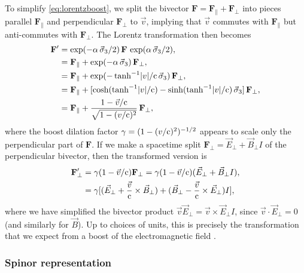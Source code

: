 \documentclass[1p,sort&compress]{elsarticle}
\numberwithin{equation}{section}
\newcommand{\rv}[1]{\vec{#1}}
\newcommand{\bv}[1]{\mathbf{#1}}
\newcommand{\cc}{{\rm c}}
\begin{document}
To simplify \eqref{eq:lorentzboost}, we split the bivector $\bv{F} = \bv{F}_\parallel + \bv{F}_\perp$ into pieces parallel $\bv{F}_\parallel$ and perpendicular $\bv{F}_\perp$ to $\rv{v}$, implying that $\rv{v}$ commutes with $\bv{F}_\parallel$ but anti-commutes with $\bv{F}_\perp$.  The Lorentz transformation then becomes
\begin{align}
  \bv{F}' &= \exp(-\alpha\, \rv{\sigma}_3/2)\,\bv{F}\,\exp(\alpha\,\rv{\sigma}_3/2), \\
  &= \bv{F}_\parallel + \exp(-\alpha\,\rv{\sigma}_3)\,\bv{F}_\perp, \nonumber \\
  &= \bv{F}_\parallel + \exp(-\tanh^{-1}\!|v|/\cc\,\rv{\sigma}_3)\, \bv{F}_\perp, \nonumber \\
  &= \bv{F}_\parallel + [\cosh(\tanh^{-1}\!|v|/\cc) - \sinh(\tanh^{-1}\!|v|/\cc)\,\rv{\sigma}_3]\,\bv{F}_\perp, \nonumber \\
  &= \bv{F}_\parallel + \frac{1 - \rv{v}/\cc}{\sqrt{1 - (v/\cc)^2}}\,\bv{F}_\perp, \nonumber
\end{align}
where the boost dilation factor $\gamma = (1 - (v/\cc)^2)^{-1/2}$ appears to scale only the perpendicular part of $\bv{F}$.  If we make a spacetime split $\bv{F}_\perp = \rv{E}_\perp + \rv{B}_\perp I$ of the perpendicular bivector, then the transformed version is
\begin{align}\label{eq:relativelorentzboost}
  \bv{F}'_\perp &= \gamma(1 - \rv{v}/\cc)\bv{F}_\perp = \gamma(1 - \rv{v}/\cc)(\rv{E}_\perp + \rv{B}_\perp I), \\
  &= \gamma[ (\rv{E}_\perp + \frac{\rv{v}}{\cc}\times\rv{B}_\perp) + (\rv{B}_\perp - \frac{\rv{v}}{\cc}\times\rv{E}_\perp)I ], \nonumber
\end{align}
where we have simplified the bivector product $\rv{v}\rv{E}_\perp = \rv{v}\times\rv{E}_\perp I$, since $\rv{v}\cdot\rv{E}_\perp = 0$ (and similarly for $\rv{B}$).  Up to choices of units, this is precisely the transformation that we expect from a boost of the electromagnetic field \cite{Landau1975,Jackson1999}.


\subsubsection{Spinor representation}

\end{document}
